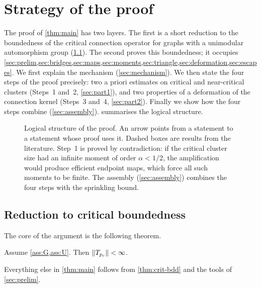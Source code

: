 \section{Strategy of the proof}\label{sec:strategy}

The proof of \cref{thm:main} has two layers. The first is a short reduction to the boundedness of the
critical connection operator for graphs with a unimodular automorphism group
(\cref{sec:reduction}). The second proves this boundedness; it occupies
\cref{sec:prelim,sec:bridges,sec:maps,sec:moments,sec:triangle,sec:deformation,sec:escapes}. We first
explain the mechanism (\cref{sec:mechanism}). We then state the four steps of the proof precisely: two a
priori estimates on critical and near-critical clusters (Steps~1 and~2, \cref{sec:part1}), and two
properties of a deformation of the connection kernel (Steps~3 and~4, \cref{sec:part2}). Finally we show
how the four steps combine (\cref{sec:assembly}).  summarises the logical
structure.

\begin{figure}[t]
\centering

\caption{Logical structure of the proof. An arrow points from a statement to a statement whose proof
uses it. Dashed boxes are results from the literature. Step~1 is proved by contradiction: if the
critical cluster size had an infinite moment of order $\alpha<1/2$, the amplification would produce
efficient endpoint maps, which force all such moments to be finite. The assembly
(\cref{sec:assembly}) combines the four steps with the sprinkling bound.}\label{fig:dependencies}
\end{figure}

\subsection{Reduction to critical boundedness}\label{sec:reduction}

The core of the argument is the following theorem.

\begin{theorem}\label{thm:crit-bdd}
Assume \cref{ass:G,ass:U}. Then $\lVert T_{p_c}\rVert<\infty$.
\end{theorem}

Everything else in \cref{thm:main} follows from \cref{thm:crit-bdd} and the tools of
\cref{sec:prelim}.

